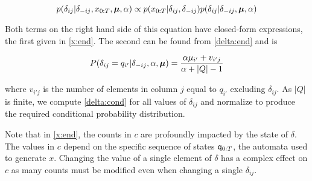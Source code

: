 \begin{equation}
p(\delta_{ij}|\delta_{-ij},x_{0:T},\bmu,\alpha) \propto p(x_{0:T}|\delta_{ij},\delta_{-ij})p(\delta_{ij}|\delta_{-ij},\bmu,\alpha) \label{delta:cond}
\end{equation}

Both terms on the right hand side of this equation have closed-form expressions, the first given in \eqref{x:end}.  The second can be found from \eqref{delta:end} and is

\begin{equation}
P(\delta_{ij} = q_{i'}|\delta_{-ij},\alpha,\bmu) = \frac{\alpha\mu_{i'} + v_{i'j}}{\alpha + |Q| - 1} \label{delta:pred}
\end{equation}

where $v_{i'j}$ is the number of elements in column $j$ equal to $q_{i'}$  excluding $\delta_{ij}$.  As $|Q|$ is finite, we compute \eqref{delta:cond} for all values of $\delta_{ij}$ and normalize to produce the required conditional probability distribution.

Note that in \eqref{x:end}, the counts in $c$ are profoundly impacted by the state of $\delta$.  The values in $c$ depend on the specific sequence of states  $\q_{0:T}$, the automata used to generate $x$.  Changing the value of a single element of $\delta$ has a complex effect on $c$ as many counts must be modified even when changing a single $\delta_{ij}.$  %

